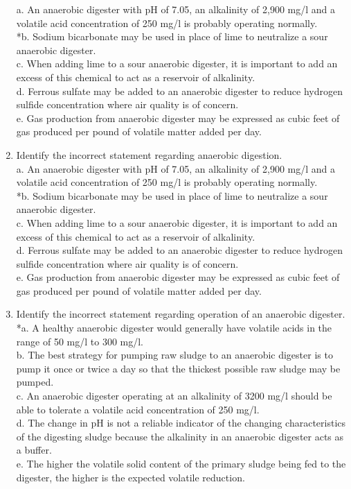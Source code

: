 \documentclass{article}
\begin{document}
\begin{enumerate}
a. An anaerobic digester with pH of 7.05, an alkalinity of 2,900 mg/l and a volatile acid concentration of 250 mg/l is probably operating normally. \\
*b. Sodium bicarbonate may be used in place of lime to neutralize a sour anaerobic digester. \\
c. When adding lime to a sour anaerobic digester, it is important to add an excess of this chemical to act as a reservoir of alkalinity. \\
d. Ferrous sulfate may be added to an anaerobic digester to reduce hydrogen sulfide concentration where air quality is of concern. \\
e. Gas production from anaerobic digester may be expressed as cubic feet of gas produced per pound of volatile matter added per day. \\

\item  Identify the incorrect statement regarding anaerobic digestion. \\

a. An anaerobic digester with pH of 7.05, an alkalinity of 2,900 mg/l and a volatile acid concentration of 250 mg/l is probably operating normally. \\
*b. Sodium bicarbonate may be used in place of lime to neutralize a sour anaerobic digester. \\
c. When adding lime to a sour anaerobic digester, it is important to add an excess of this chemical to act as a reservoir of alkalinity. \\
d. Ferrous sulfate may be added to an anaerobic digester to reduce hydrogen sulfide concentration where air quality is of concern. \\
e. Gas production from anaerobic digester may be expressed as cubic feet of gas produced per pound of volatile matter added per day. \\

\item  Identify the incorrect statement regarding operation of an anaerobic digester. \\

*a. A healthy anaerobic digester would generally have volatile acids in the range of 50 mg/l to 300 mg/l. \\
b. The best strategy for pumping raw sludge to an anaerobic digester is to pump it once or twice a day so that the thickest possible raw sludge may be pumped. \\
c. An anaerobic digester operating at an alkalinity of 3200 mg/l should be able to tolerate a volatile acid concentration of 250 mg/l. \\
d. The change in pH is not a reliable indicator of the changing characteristics of the digesting sludge because the alkalinity in an anaerobic digester acts as a buffer. \\
e. The higher the volatile solid content of the primary sludge being fed to the digester, the higher is the expected volatile reduction. \\


\end{enumerate}
\end{document}
